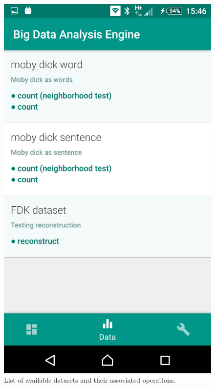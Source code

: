 \begin{figure}[h!]
	\centering
  	\begin{minipage}[b]{0.4\textwidth}
    		\includegraphics[width=\textwidth]{img/datasets.png}
   	  	\caption[]{List of available datasets and their associated operations.}
    \end{minipage}
  	\hfill
  	\begin{minipage}[b]{0.4\textwidth}

\end{minipage}
\end{figure}
